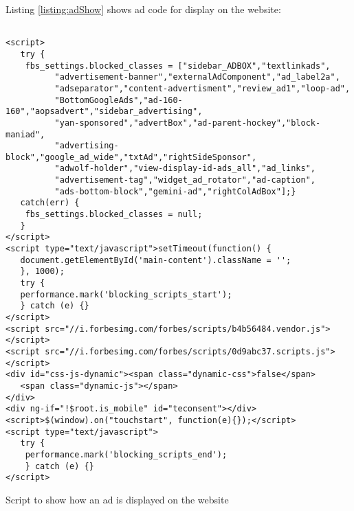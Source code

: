 \documentclass[runningheads,a4paper]{llncs}
\begin{document}
Listing \ref{listing:adShow} shows ad code for display on the website:
\begin{listing}[!ht]
\begin{verbatim}
               
<script>
   try {
   	fbs_settings.blocked_classes = ["sidebar_ADBOX","textlinkads",
          "advertisement-banner","externalAdComponent","ad_label2a",
          "adseparator","content-advertisment","review_ad1","loop-ad",
          "BottomGoogleAds","ad-160-160","aopsadvert","sidebar_advertising",
          "yan-sponsored","advertBox","ad-parent-hockey","block-maniad",
          "advertising-block","google_ad_wide","txtAd","rightSideSponsor",
          "adwolf-holder","view-display-id-ads_all","ad_links",
          "advertisement-tag","widget_ad_rotator","ad-caption",
          "ads-bottom-block","gemini-ad","rightColAdBox"];} 
   catch(err) {
   	fbs_settings.blocked_classes = null;
   }
</script>
<script type="text/javascript">setTimeout(function() {
   document.getElementById('main-content').className = '';
   }, 1000);
   try {
   performance.mark('blocking_scripts_start');
   } catch (e) {}
</script>
<script src="//i.forbesimg.com/forbes/scripts/b4b56484.vendor.js"></script>
<script src="//i.forbesimg.com/forbes/scripts/0d9abc37.scripts.js"></script>
<div id="css-js-dynamic"><span class="dynamic-css">false</span>
   <span class="dynamic-js"></span>
</div>
<div ng-if="!$root.is_mobile" id="teconsent"></div>
<script>$(window).on("touchstart", function(e){});</script>
<script type="text/javascript">
   try {
   	performance.mark('blocking_scripts_end');
   	} catch (e) {}
</script>
\end{verbatim}
\caption{Script to show how an ad is displayed on the website}
\label{listing:adShow}
\end{listing}
\end{document}
